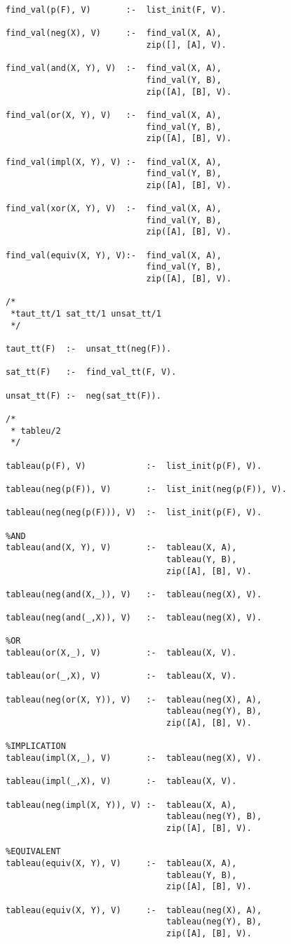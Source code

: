 \documentclass[a4paper,10pt]{article}
\begin{document}
\begin{lstlisting}
find_val(p(F), V)		:- 	list_init(F, V).

find_val(neg(X), V)		:- 	find_val(X, A),
							zip([], [A], V).

find_val(and(X, Y), V)	:- 	find_val(X, A),
							find_val(Y, B),
							zip([A], [B], V).

find_val(or(X, Y), V)	:- 	find_val(X, A),
							find_val(Y, B),
							zip([A], [B], V).
							
find_val(impl(X, Y), V)	:- 	find_val(X, A),
							find_val(Y, B),
							zip([A], [B], V).

find_val(xor(X, Y), V)	:- 	find_val(X, A),
							find_val(Y, B),
							zip([A], [B], V).

find_val(equiv(X, Y), V):- 	find_val(X, A),
							find_val(Y, B),
							zip([A], [B], V).

/* 
 *taut_tt/1 sat_tt/1 unsat_tt/1
 */

taut_tt(F)	:-	unsat_tt(neg(F)).

sat_tt(F)	:-	find_val_tt(F, V).

unsat_tt(F)	:-	neg(sat_tt(F)).

/*
 * tableu/2
 */

tableau(p(F), V)			:-	list_init(p(F), V).

tableau(neg(p(F)), V)		:-	list_init(neg(p(F)), V).

tableau(neg(neg(p(F))), V)	:-	list_init(p(F), V).

%AND
tableau(and(X, Y), V)		:-	tableau(X, A),
								tableau(Y, B),
								zip([A], [B], V).
						
tableau(neg(and(X,_)), V)	:-	tableau(neg(X), V).

tableau(neg(and(_,X)), V)	:-	tableau(neg(X), V).

%OR
tableau(or(X,_), V)			:-	tableau(X, V).

tableau(or(_,X), V)			:-	tableau(X, V).

tableau(neg(or(X, Y)), V)	:-	tableau(neg(X), A),
								tableau(neg(Y), B),
								zip([A], [B], V).

%IMPLICATION
tableau(impl(X,_), V)		:-	tableau(neg(X), V).

tableau(impl(_,X), V)		:-	tableau(X, V).

tableau(neg(impl(X, Y)), V)	:-	tableau(X, A),
								tableau(neg(Y), B),
								zip([A], [B], V).

%EQUIVALENT
tableau(equiv(X, Y), V)		:-	tableau(X, A),
								tableau(Y, B),
								zip([A], [B], V).

tableau(equiv(X, Y), V)		:-	tableau(neg(X), A),
								tableau(neg(Y), B),
								zip([A], [B], V).
							

\end{lstlisting}
\end{document}
